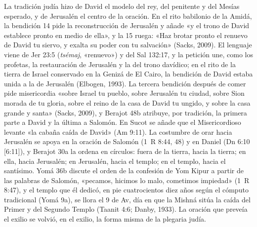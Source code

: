 La tradición judía hizo de David el modelo del rey, del penitente y del Mesías esperado, y de Jerusalén el centro de la oración. En el rito babilonio de la Amidá, la bendición 14 pide la reconstrucción de Jerusalén y añade «y el trono de David establece pronto en medio de ella», y la 15 ruega: «Haz brotar pronto el renuevo de David tu siervo, y exalta su poder con tu salvación» (Sacks, 2009). El lenguaje viene de Jer 23:5 (\emph{tsémaj}, «renuevo») y del Sal 132:17, y la petición une, como los profetas, la restauración de Jerusalén y la del trono davídico; en el rito de la tierra de Israel conservado en la Genizá de El Cairo, la bendición de David estaba unida a la de Jerusalén (Elbogen, 1993). La tercera bendición después de comer pide misericordia «sobre Israel tu pueblo, sobre Jerusalén tu ciudad, sobre Sion morada de tu gloria, sobre el reino de la casa de David tu ungido, y sobre la casa grande y santa» (Sacks, 2009), y Berajot 48b atribuye, por tradición, la primera parte a David y la última a Salomón. En Sucot se añade que el Misericordioso levante «la cabaña caída de David» (Am 9:11). La costumbre de orar hacia Jerusalén se apoya en la oración de Salomón (1~R 8:44, 48) y en Daniel (Dn 6:10 [6:11]), y Berajot 30a la ordena en círculos: fuera de la tierra, hacia la tierra; en ella, hacia Jerusalén; en Jerusalén, hacia el templo; en el templo, hacia el santísimo. Yomá 36b discute el orden de la confesión de Yom Kipur a partir de las palabras de Salomón, «pecamos, hicimos lo malo, cometimos impiedad» (1~R 8:47), y el templo que él dedicó, en pie cuatrocientos diez años según el cómputo tradicional (Yomá 9a), se llora el 9 de Av, día en que la Mishná sitúa la caída del Primer y del Segundo Templo (Taanit 4:6; Danby, 1933). La oración que preveía el exilio se volvió, en el exilio, la forma misma de la plegaria judía.

